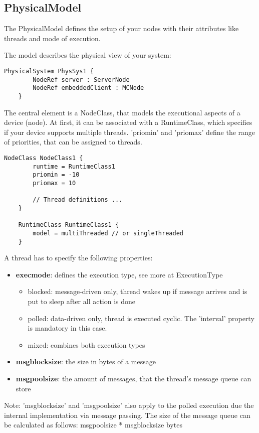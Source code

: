 \subsection{PhysicalModel}
	\hypertarget{ref:PhysicalModel}{}
	The PhysicalModel defines the setup of your nodes with their attributes like threads and mode of execution.
		
	The model describes the physical view of your system:
	\begin{lstlisting}[language=etPhys]
	PhysicalSystem PhysSys1 {
		NodeRef server : ServerNode
		NodeRef embeddedClient : MCNode
	}
	\end{lstlisting}
	
	The central element is a NodeClass, that models the executional aspects of a device (node).
	At first, it can be associated with a RuntimeClass, which specifies if your device supports multiple threads.
	'priomin' and 'priomax' define the range of priorities, that can be assigned to threads.
	
	\begin{lstlisting}[language=etPhys]
	NodeClass NodeClass1 {
		runtime = RuntimeClass1
		priomin = -10
		priomax = 10
	
		// Thread definitions ...
	}
	
	RuntimeClass RuntimeClass1 {
		model = multiThreaded // or singleThreaded
	}
	\end{lstlisting}
	
	A thread has to specify the following properties:
	\begin{itemize}
		\item \textbf{execmode}: defines the execution type, see more at ExecutionType
		\begin{itemize}
			\item blocked: message-driven only, thread wakes up if message arrives and is put to sleep after all action is done
			\item polled: data-driven only, thread is executed cyclic. The 'interval' property is mandatory in this case.
			\item mixed: combines both execution types
		\end{itemize}
		\item \textbf{msgblocksize}: the size in bytes of a message
		\item \textbf{msgpoolsize}:  the amount of messages, that the thread's message queue can store
	\end{itemize}
	Note: 'msgblocksize' and 'msgpoolsize' also apply to the polled execution due the internal implementation via message passing.
	 The size of the message queue can be calculated as follows: msgpoolsize * msgblocksize bytes 
	

